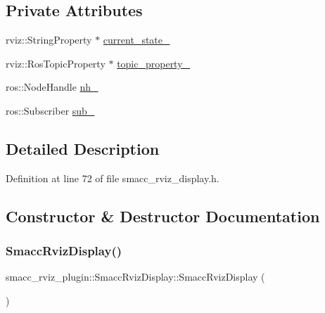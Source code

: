 \subsection*{Private Attributes}
\begin{DoxyCompactItemize}
\item 
rviz\+::\+String\+Property $\ast$ \hyperlink{classsmacc__rviz__plugin_1_1SmaccRvizDisplay_a342ff238c1dfaa427f09ee205a9e92d5}{current\+\_\+state\+\_\+}
\item 
rviz\+::\+Ros\+Topic\+Property $\ast$ \hyperlink{classsmacc__rviz__plugin_1_1SmaccRvizDisplay_ad81e5239e1343b2ba01ee16d1f010932}{topic\+\_\+property\+\_\+}
\item 
ros\+::\+Node\+Handle \hyperlink{classsmacc__rviz__plugin_1_1SmaccRvizDisplay_a077ef80f5698d21376b2d211f95ab73d}{nh\+\_\+}
\item 
ros\+::\+Subscriber \hyperlink{classsmacc__rviz__plugin_1_1SmaccRvizDisplay_abae6e8df8428a072d1de2c59dd4f9cd4}{sub\+\_\+}
\end{DoxyCompactItemize}


\subsection{Detailed Description}


Definition at line 72 of file smacc\+\_\+rviz\+\_\+display.\+h.



\subsection{Constructor \& Destructor Documentation}
\mbox{\label{classsmacc__rviz__plugin_1_1SmaccRvizDisplay_a57d912b6eeec19a0654546bb011fb593}} 
\subsubsection{\texorpdfstring{Smacc\+Rviz\+Display()}{SmaccRvizDisplay()}}
{\footnotesize\ttfamily smacc\+\_\+rviz\+\_\+plugin\+::\+Smacc\+Rviz\+Display\+::\+Smacc\+Rviz\+Display (\begin{DoxyParamCaption}{ }\end{DoxyParamCaption})}



